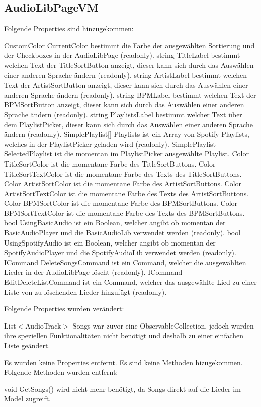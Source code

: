\documentclass[../implementierung.tex]{subfiles}
\begin{document}
		\subsection{AudioLibPageVM}
			Folgende Properties sind hinzugekommen:
			\begin{itemize}
				\add CustomColor CurrentColor bestimmt die Farbe der ausgewählten Sortierung und der Checkboxes in der AudioLibPage (readonly).
				\add string TitleLabel bestimmt welchen Text der TitleSortButton anzeigt, dieser kann sich durch das Auswählen einer anderen Sprache ändern (readonly).
				\add string ArtistLabel bestimmt welchen Text der ArtistSortButton anzeigt, dieser kann sich durch das Auswählen einer anderen Sprache ändern (readonly).
				\add string BPMLabel bestimmt welchen Text der BPMSortButton anzeigt, dieser kann sich durch das Auswählen einer anderen Sprache ändern (readonly).
				\add string PlaylistsLabel bestimmt welcher Text über dem PlaylistPicker, dieser kann sich durch das Auswählen einer anderen Sprache ändern (readonly).
				\add SimplePlaylist[] Playlists ist ein Array von Spotify-Playlists, welches in der PlaylistPicker geladen wird (readonly).
				\add SimplePlaylist SelectedPlaylist ist die momentan im PlaylistPicker ausgewählte Playlist.
				\add Color TitleSortColor ist die momentane Farbe des TitleSortButtons.
				\add Color TitleSortTextColor ist die momentane Farbe des Texts des TitleSortButtons.
				\add Color ArtistSortColor ist die momentane Farbe des ArtistSortButtons.
				\add Color ArtistSortTextColor ist die momentane Farbe des Texts des ArtistSortButtons.
				\add Color BPMSortColor ist die momentane Farbe des BPMSortButtons.
				\add Color BPMSortTextColor ist die momentane Farbe des Texts des BPMSortButtons.
				\add bool UsingBasicAudio ist ein Boolean, welcher angibt ob momentan der BasicAudioPlayer und die BasicAudioLib verwendet werden (readonly).
				\add bool UsingSpotifyAudio ist ein Boolean, welcher angibt ob momentan der SpotifyAudioPlayer und die SpotifyAudioLib verwendet werden (readonly).
				\add ICommand DeleteSongsCommand ist ein Command, welcher die ausgewählten Lieder in der AudioLibPage löscht (readonly).
				\add ICommand EditDeleteListCommand ist ein Command, welcher das ausgewählte Lied zu einer Liste von zu löschenden Lieder hinzufügt (readonly).
			\end{itemize}
			Folgende Properties wurden verändert:
			\begin{itemize}
				\changed List$<$AudioTrack$>$ Songs war zuvor eine ObservableCollection, jedoch wurden ihre speziellen Funktionalitäten nicht benötigt und deshalb zu einer einfachen Liste geändert.	
			\end{itemize}
			Es wurden keine Properties entfernt. \newline
			Es sind keine Methoden hizugekommen. \newline
			Folgende Methoden wurden entfernt:
			\begin{itemize}
				\remove void GetSongs() wird nicht mehr benötigt, da Songs direkt auf die Lieder im Model zugreift.	
			\end{itemize}
\end{document}
